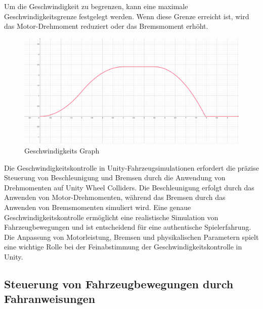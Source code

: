 Um die Geschwindigkeit zu begrenzen, kann eine maximale Geschwindigkeitsgrenze festgelegt werden. Wenn diese Grenze erreicht ist, wird das Motor-Drehmoment reduziert oder das Bremsmoment erhöht.\\


\begin{figure}[htp]
    \centering
    \includegraphics[width=15cm]{images/Geschwingkeit.pdf}
    \caption{Geschwindigkeits Graph}
    \label{fig: Geschwindigkeit}
\end{figure}

Die Geschwindigkeitskontrolle in Unity-Fahrzeugsimulationen erfordert die präzise Steuerung von Beschleunigung und Bremsen durch die Anwendung von Drehmomenten auf Unity Wheel Colliders. Die Beschleunigung erfolgt durch das Anwenden von Motor-Drehmomenten, während das Bremsen durch das Anwenden von Bremsmomenten simuliert wird. Eine genaue Geschwindigkeitskontrolle ermöglicht eine realistische Simulation von Fahrzeugbewegungen und ist entscheidend für eine authentische Spielerfahrung. Die Anpassung von Motorleistung, Bremsen und physikalischen Parametern spielt eine wichtige Rolle bei der Feinabstimmung der Geschwindigkeitskontrolle in Unity.\\





\subsection{Steuerung von Fahrzeugbewegungen durch Fahranweisungen}

